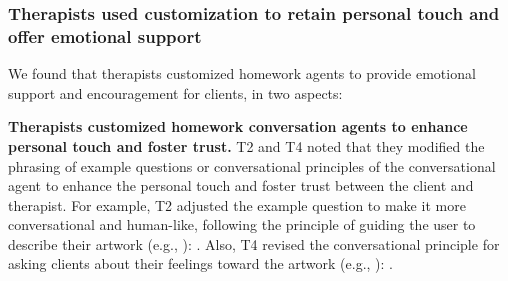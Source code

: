 

\subsubsection{\textbf{Therapists used customization to retain personal touch and offer emotional support}}
We found that therapists customized homework agents to provide emotional support and encouragement for clients, in two aspects:

\textbf{Therapists customized homework conversation agents to enhance personal touch and foster trust.}
T2 and T4 noted that they modified the phrasing of example questions or conversational principles of the conversational agent to enhance the personal touch and foster trust between the client and therapist. 
For example, T2 adjusted the example question to make it more conversational and human-like, following the principle of guiding the user to describe their artwork (e.g., ): .
Also, T4 revised the conversational principle for asking clients about their feelings toward the artwork (e.g., ): .


